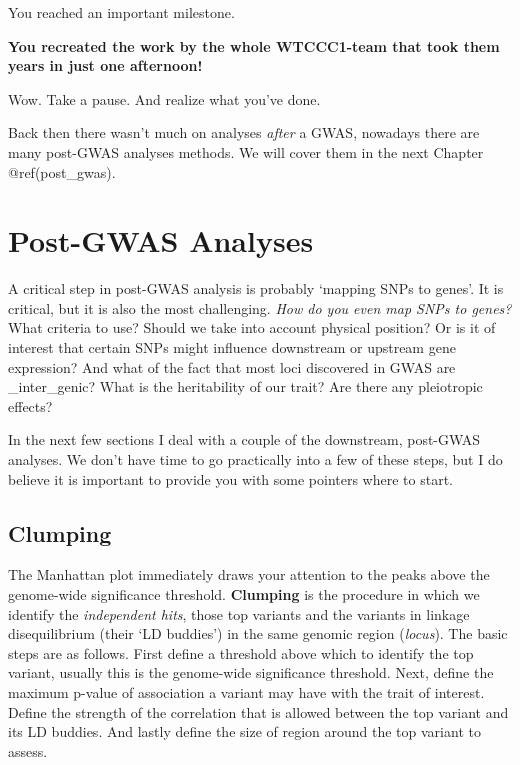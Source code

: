 \documentclass[
]{book}
\begin{document}
You reached an important milestone.

\textbf{You recreated the work by the whole WTCCC1-team that took them years in just one afternoon!}

Wow. Take a pause. And realize what you've done.

Back then there wasn't much on analyses \emph{after} a GWAS, nowadays there are many post-GWAS analyses methods. We will cover them in the next Chapter @ref(post\_gwas).

\hypertarget{post_gwas}{%
\chapter{Post-GWAS Analyses}\label{post_gwas}}

A critical step in post-GWAS analysis is probably `mapping SNPs to genes'. It is critical, but it is also the most challenging. \emph{How do you even map SNPs to genes?} What criteria to use? Should we take into account physical position? Or is it of interest that certain SNPs might influence downstream or upstream gene expression? And what of the fact that most loci discovered in GWAS are \_inter\_genic? What is the heritability of our trait? Are there any pleiotropic effects?

In the next few sections I deal with a couple of the downstream, post-GWAS analyses. We don't have time to go practically into a few of these steps, but I do believe it is important to provide you with some pointers where to start.

\hypertarget{clumping}{%
\section{Clumping}\label{clumping}}

The Manhattan plot immediately draws your attention to the peaks above the genome-wide significance threshold. \textbf{Clumping} is the procedure in which we identify the \emph{independent hits}, those top variants and the variants in linkage disequilibrium (their `LD buddies') in the same genomic region (\emph{locus}). The basic steps are as follows. First define a threshold above which to identify the top variant, usually this is the genome-wide significance threshold. Next, define the maximum p-value of association a variant may have with the trait of interest. Define the strength of the correlation that is allowed between the top variant and its LD buddies. And lastly define the size of region around the top variant to assess.
\end{document}

